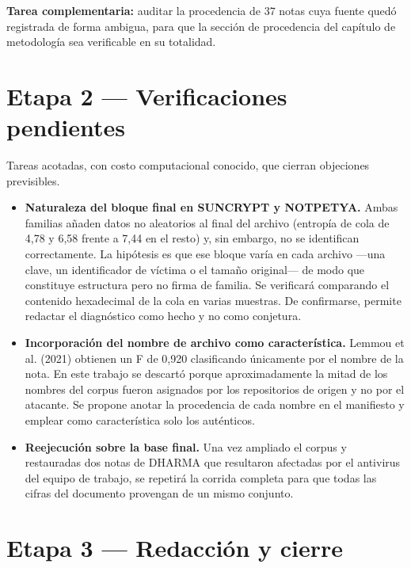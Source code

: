 \documentclass[11pt,a4paper]{article}
\begin{document}
\textbf{Tarea complementaria:} auditar la procedencia de 37 notas cuya fuente quedó registrada
de forma ambigua, para que la sección de procedencia del capítulo de metodología sea
verificable en su totalidad.

\section*{Etapa 2 --- Verificaciones pendientes}

Tareas acotadas, con costo computacional conocido, que cierran objeciones previsibles.

\begin{itemize}
\item \textbf{Naturaleza del bloque final en SUNCRYPT y NOTPETYA.} Ambas familias añaden
datos no aleatorios al final del archivo (entropía de cola de 4,78 y 6,58 frente a 7,44 en el
resto) y, sin embargo, no se identifican correctamente. La hipótesis es que ese bloque varía
en cada archivo ---una clave, un identificador de víctima o el tamaño original--- de modo que
constituye estructura pero no firma de familia. Se verificará comparando el contenido
hexadecimal de la cola en varias muestras. De confirmarse, permite redactar el diagnóstico
como hecho y no como conjetura.
\item \textbf{Incorporación del nombre de archivo como característica.} Lemmou et al. (2021)
obtienen un F de 0,920 clasificando únicamente por el nombre de la nota. En este trabajo se
descartó porque aproximadamente la mitad de los nombres del corpus fueron asignados por los
repositorios de origen y no por el atacante. Se propone anotar la procedencia de cada nombre
en el manifiesto y emplear como característica solo los auténticos.
\item \textbf{Reejecución sobre la base final.} Una vez ampliado el corpus y restauradas dos
notas de DHARMA que resultaron afectadas por el antivirus del equipo de trabajo, se repetirá
la corrida completa para que todas las cifras del documento provengan de un mismo conjunto.
\end{itemize}

\section*{Etapa 3 --- Redacción y cierre}
\end{document}
